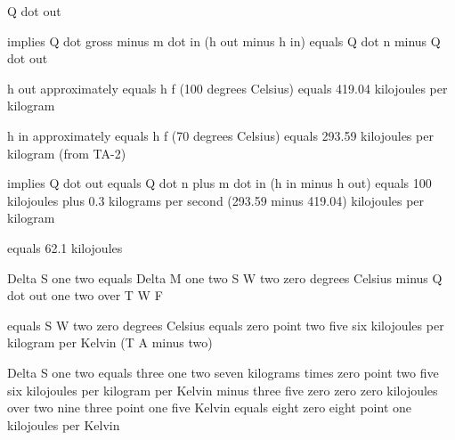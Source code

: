 Q dot out

implies Q dot gross minus m dot in (h out minus h in) equals Q dot n minus Q dot out

h out approximately equals h f (100 degrees Celsius) equals 419.04 kilojoules per kilogram

h in approximately equals h f (70 degrees Celsius) equals 293.59 kilojoules per kilogram (from TA-2)

implies Q dot out equals Q dot n plus m dot in (h in minus h out) equals 100 kilojoules plus 0.3 kilograms per second (293.59 minus 419.04) kilojoules per kilogram

equals 62.1 kilojoules

Delta S one two equals Delta M one two S W two zero degrees Celsius minus Q dot out one two over T W F  

equals S W two zero degrees Celsius equals zero point two five six kilojoules per kilogram per Kelvin (T A minus two)  

Delta S one two equals three one two seven kilograms times zero point two five six kilojoules per kilogram per Kelvin minus three five zero zero zero kilojoules over two nine three point one five Kelvin equals eight zero eight point one kilojoules per Kelvin
